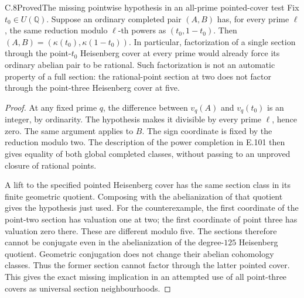 \begin{result}{C.8}{Proved}{The missing pointwise hypothesis in an all-prime pointed-cover test}
Fix \(t_0\in U(\mathbb Q)\). Suppose an ordinary completed pair
\((A,B)\) has, for every prime \(\ell\), the same reduction modulo
\(\ell\)-th powers as \((t_0,1-t_0)\). Then
\((A,B)=(\kappa(t_0),\kappa(1-t_0))\).
In particular, factorization of a single section through the
point-\(t_0\) Heisenberg cover at every prime would already force its
ordinary abelian pair to be rational. Such factorization is not an
automatic property of a full section: the rational-point section at
two does not factor through the point-three Heisenberg cover at five.
\end{result}
\begin{proof}
At any fixed prime \(q\), the difference between \(v_q(A)\) and
\(v_q(t_0)\) is an integer, by ordinarity. The hypothesis makes it
divisible by every prime \(\ell\), hence zero. The same argument
applies to \(B\). The sign coordinate is fixed by the reduction
modulo two. The description of the power completion in E.101 then
gives equality of both global completed classes, without passing to
an unproved closure of rational points.

A lift to the specified pointed Heisenberg cover has the same section
class in its finite geometric quotient. Composing with the
abelianization of that quotient gives the hypothesis just used.
For the counterexample, the first coordinate of the point-two section
has valuation one at two; the first coordinate of point three has
valuation zero there. These are different modulo five. The sections
therefore cannot be conjugate even in the abelianization of the
degree-\(125\) Heisenberg quotient. Geometric conjugation does not
change their abelian cohomology classes. Thus the former section
cannot factor through the latter pointed cover. This gives the exact
missing implication in an attempted use of all point-three covers as
universal section neighbourhoods.
\end{proof}
